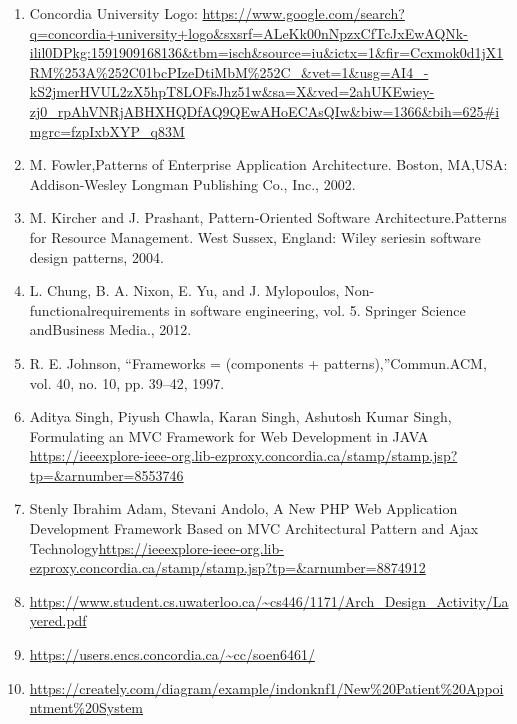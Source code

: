 \documentclass[a4paper,12pt]{report}
\begin{document}
\begin{enumerate}
    \item Concordia University Logo: \url{https://www.google.com/search?q=concordia+university+logo&sxsrf=ALeKk00nNpzxCfTcJxEwAQNk-ilil0DPkg:1591909168136&tbm=isch&source=iu&ictx=1&fir=Ccxmok0d1jX1RM%253A%252C01bcPIzeDtiMbM%252C_&vet=1&usg=AI4_-kS2jmerHVUL2zX5hpT8LOFsJhz51w&sa=X&ved=2ahUKEwiey-zj0_rpAhVNRjABHXHQDfAQ9QEwAHoECAsQIw&biw=1366&bih=625#imgrc=fzpIxbXYP_q83M}
    
    
    \item
    M. Fowler,Patterns of Enterprise Application Architecture. Boston, MA,USA: Addison-Wesley Longman Publishing Co., Inc., 2002.
    
    \item
    M. Kircher and J. Prashant, Pattern-Oriented Software Architecture.Patterns for Resource Management. West Sussex, England: Wiley seriesin software design patterns, 2004.
    
    \item L. Chung, B. A. Nixon, E. Yu, and J. Mylopoulos, Non-functionalrequirements in software engineering, vol. 5.  Springer Science andBusiness Media., 2012.
    
    \item R. E. Johnson, “Frameworks = (components + patterns),”Commun.ACM, vol. 40, no. 10, pp. 39–42, 1997.
    
    \item 
    Aditya Singh, Piyush Chawla, Karan Singh, Ashutosh Kumar Singh, Formulating an MVC Framework for Web Development in JAVA \url{https://ieeexplore-ieee-org.lib-ezproxy.concordia.ca/stamp/stamp.jsp?tp=&arnumber=8553746}
    
    \item 
    Stenly Ibrahim Adam, Stevani Andolo, A New PHP Web Application Development Framework Based on MVC Architectural Pattern and Ajax Technology\url{https://ieeexplore-ieee-org.lib-ezproxy.concordia.ca/stamp/stamp.jsp?tp=&arnumber=8874912}
    
    \item \url{https://www.student.cs.uwaterloo.ca/~cs446/1171/Arch_Design_Activity/Layered.pdf}
    
     \item \url{https://users.encs.concordia.ca/~cc/soen6461/}
    
    \item \url{https://creately.com/diagram/example/indonknf1/New%20Patient%20Appointment%20System}
     

\end{enumerate}
\end{document}
